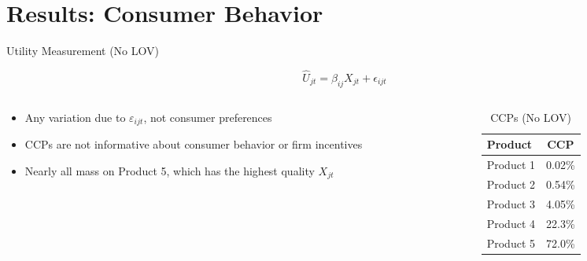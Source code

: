 \documentclass[aspectratio=169,professionalfonts]{beamer}
\begin{document}
\section{Results: Consumer Behavior}

\begin{frame}{Utility Measurement (No LOV)}
  \begin{tcolorbox}[colback=red!5!white, colframe=UGARed, title=\textbf{Utility Function without LOV}]
    \begin{equation*}
      \hat{U}_{jt} = \beta_{ij} X_{jt} + \epsilon_{ijt}
    \end{equation*}
  \end{tcolorbox}
  \begin{columns}[T]
    \begin{column}{0.5\textwidth}
      
      \begin{itemize}
        \item Any variation due to $\varepsilon_{ijt}$, not consumer preferences
        \item CCPs are not informative about consumer behavior or firm incentives
        \item Nearly all mass on Product 5, which has the highest quality $X_{jt}$
      \end{itemize}
    \end{column}
    \begin{column}{0.47\textwidth}
      \begin{table}
        \caption{CCPs (No LOV)}
        \begin{tabular}{lc}
          \toprule
          Product & CCP \\
          \midrule
          Product 1     & 0.02\% \\
          Product 2     & 0.54\% \\
          Product 3     & 4.05\% \\
          Product 4     & 22.3\% \\
          Product 5     & 72.0\% \\
          \bottomrule
        \end{tabular}
      \end{table}
    \end{column}
  \end{columns}
\end{frame}
\end{document}
